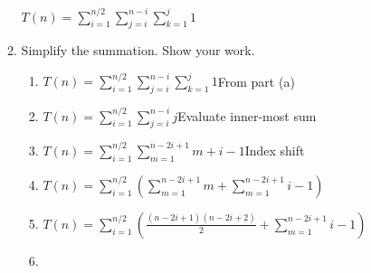 \documentclass[12pt]{article}
\begin{document}
\begin{enumerate}
\begin{enumerate}
            $T(n) = \sum_{i=1}^{n/2} \sum_{j=i}^{n-i} \sum_{k=1}^{j} 1$

            \item Simplify the summation. Show your work.
                \begin{enumerate}
                    \item $T(n) = \sum_{i=1}^{n/2} \sum_{j=i}^{n-i} \sum_{k=1}^{j} 1$\hfill From part (a)
                    \item $T(n) = \sum_{i=1}^{n/2} \sum_{j=i}^{n-i} j$\hfill Evaluate inner-most sum
                    \item $T(n) = \sum_{i=1}^{n/2} \sum_{m=1}^{n-2i+1} m + i - 1$\hfill Index shift
                    \item $T(n) = \sum_{i=1}^{n/2} ( \sum_{m=1}^{n-2i+1} m + \sum_{m=1}^{n-2i+1} i - 1)$
                    \item $T(n) = \sum_{i=1}^{n/2} ( \frac{(n-2i+1)(n-2i+2)}{2} + \sum_{m=1}^{n-2i+1} i - 1)$
                    \item 
                \end{enumerate}
        \end{enumerate}


\end{enumerate}
\end{document}
